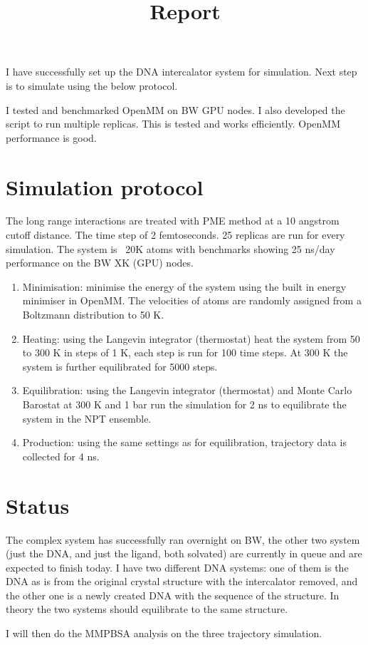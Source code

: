 \documentclass{article}
\title{Report}
\begin{document}
\maketitle

I have successfully set up the DNA intercalator system for simulation. Next step is to simulate using the below protocol.

I tested and benchmarked OpenMM on BW GPU nodes. I also developed the script to run multiple replicas. This is tested and works efficiently. OpenMM performance is good.

\section{Simulation protocol}

The long range interactions are treated with PME method at a 10 angstrom cutoff distance. The time step of 2 femtoseconds. 25 replicas are run for every simulation. The system is ~20K atoms with benchmarks showing 25 ns/day performance on the BW XK (GPU) nodes.

\begin{enumerate}
  \item Minimisation: minimise the energy of the system using the built in energy minimiser in OpenMM. The velocities of atoms are randomly assigned from a Boltzmann distribution to 50 K.
  \item Heating: using the Langevin integrator (thermostat) heat the system from 50 to 300 K in steps of 1 K, each step is run for 100 time steps. At 300 K the system is further equilibrated for 5000 steps.
  \item Equilibration: using the Langevin integrator (thermostat) and Monte Carlo Barostat at 300 K and 1 bar run the simulation for 2 ns to equilibrate the system in the NPT ensemble.
  \item Production: using the same settings as for equilibration, trajectory data is collected for 4 ns.
\end{enumerate}

\section{Status}

The complex system has successfully ran overnight on BW, the other two system (just the DNA, and just the ligand, both solvated) are currently in queue and are expected to finish today. I have two different DNA systems: one of them is the DNA as is from the original crystal structure with the intercalator removed, and the other one is a newly created DNA with the sequence of the structure. In theory the two systems should equilibrate to the same structure.

I will then do the MMPBSA analysis on the three trajectory simulation.
\end{document}
